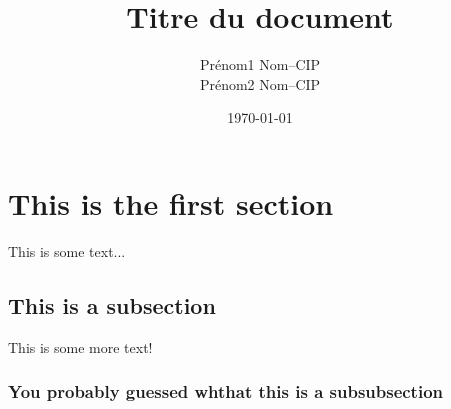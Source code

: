 \documentclass[a4paper, 11pt]{article}
\title{Titre du document}
\author{
  \addtolength{\tabcolsep}{-0.4em}
  \begin{tabular}{rcl} %
  Prénom1 Nom    & -- & CIP \\
  Prénom2 Nom    & -- & CIP \\
  \end{tabular}
}
\date{\today}
\begin{document}
\maketitle
\newpage
\tableofcontents

\section{This is the first section}
This is some text...

\subsection{This is a subsection}
This is some more text!


\subsubsection{You probably guessed whthat this is a subsubsection}




\end{document}
